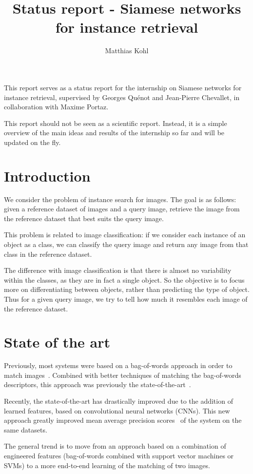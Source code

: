\documentclass[fleqn]{article}
\title{Status report - Siamese networks for instance retrieval}
\author{Matthias Kohl}
\begin{document}
\maketitle

This report serves as a status report for the internship on
Siamese networks for instance retrieval,
supervised by Georges Quénot and Jean-Pierre Chevallet,
in collaboration with Maxime Portaz.

This report should not be seen as a scientific report.
Instead, it is a simple overview of the main ideas and
results of the internship so far and will be updated on the fly.

\section{Introduction}
We consider the problem of instance search for images.
The goal is as follows:
given a reference dataset of images and a query image,
retrieve the image from the reference dataset that
best suits the query image.

This problem is related to image classification:
if we consider each instance of an object as a class,
we can classify the query image and return any image
from that class in the reference dataset.

The difference with image classification is that
there is almost no variability within the classes,
as they are in fact a single object.
So the objective is to focus more on differentiating between objects,
rather than predicting the type of object.
Thus for a given query image, we try to tell how much it resembles each
image of the reference dataset.

\section{State of the art}
Previously, most systems were based on a bag-of-words approach
in order to match images~\cite{philbin_object_2007}.
Combined with better techniques of matching the bag-of-words descriptors,
this approach was previously the state-of-the-art~\cite{mikulik_learning_2013}.

Recently, the state-of-the-art has drastically improved due to the
addition of learned features, based on convolutional neural networks
(CNNs).
This new approach greatly improved
mean average precision scores~\cite{gordo_deep_2016} of the system
on the same datasets.

The general trend is to move from an approach based on a combination of
engineered features (bag-of-words combined with
support vector machines or SVMs) to a more end-to-end learning of
the matching of two images.
\end{document}
